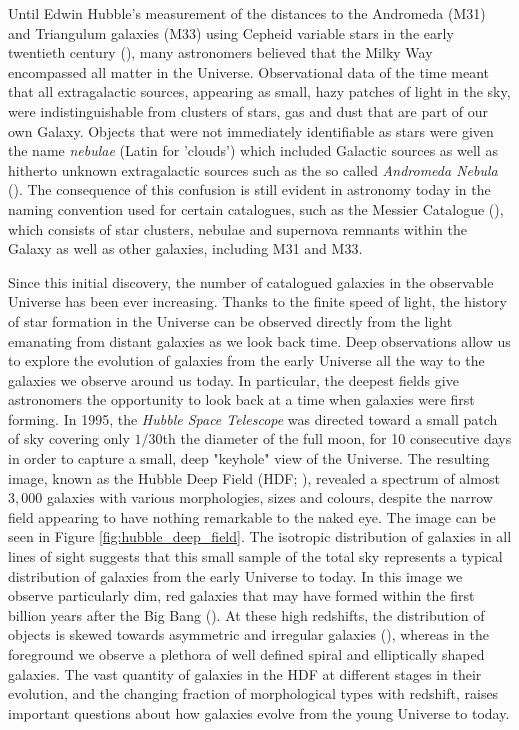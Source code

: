 \sloppy

Until Edwin Hubble's measurement of the distances to the Andromeda (M31) and Triangulum galaxies (M33) using Cepheid variable stars in the early twentieth century (\citealt{Hubble_1925}), many astronomers believed that the Milky Way encompassed all matter in the Universe. Observational data of the time meant that all extragalactic sources, appearing as small, hazy patches of light in the sky, were indistinguishable from clusters of stars, gas and dust that are part of our own Galaxy. Objects that were not immediately identifiable as stars were given the name \textit{nebulae} (Latin for 'clouds') which included Galactic sources as well as hitherto unknown extragalactic sources such as the so called \textit{Andromeda Nebula} (\citealt{Herschel_1785}). The consequence of this confusion is still evident in astronomy today in the naming convention used for certain catalogues, such as the Messier Catalogue (\citealt{Messier_1771, Messier_1781}), which consists of star clusters, nebulae and supernova remnants within the Galaxy as well as other galaxies, including M31 and M33.

Since this initial discovery, the number of catalogued galaxies in the observable Universe has been ever increasing. Thanks to the finite speed of light, the history of star formation in the Universe can be observed directly from the light emanating from distant galaxies as we look back time. Deep observations allow us to explore the evolution of galaxies from the early Universe all the way to the galaxies we observe around us today. In particular, the deepest fields give astronomers the opportunity to look back at a time when galaxies were first forming. In 1995, the \textit{Hubble Space Telescope} was directed toward a small patch of sky covering only $1/30$th the diameter of the full moon, for 10 consecutive days in order to capture a small, deep "keyhole" view of the Universe. The resulting image, known as the Hubble Deep Field (HDF; \citealt{Williams_1996, Ferguson_2000}), revealed a spectrum of almost $3,000$ galaxies with various morphologies, sizes and colours, despite the narrow field appearing to have nothing remarkable to the naked eye. The image can be seen in Figure \ref{fig:hubble_deep_field}. The isotropic distribution of galaxies in all lines of sight suggests that this small sample of the total sky represents a typical distribution of galaxies from the early Universe to today. In this image we observe particularly dim, red galaxies that may have formed within the first billion years after the Big Bang (\citealt{Madau_1996}). At these high redshifts, the distribution of objects is skewed towards asymmetric and irregular galaxies (\citealt{Abraham_1996}), whereas in the foreground we observe a plethora of well defined spiral and elliptically shaped galaxies. The vast quantity of galaxies in the HDF at different stages in their evolution, and the changing fraction of morphological types with redshift, raises important questions about how galaxies evolve from the young Universe to today.

